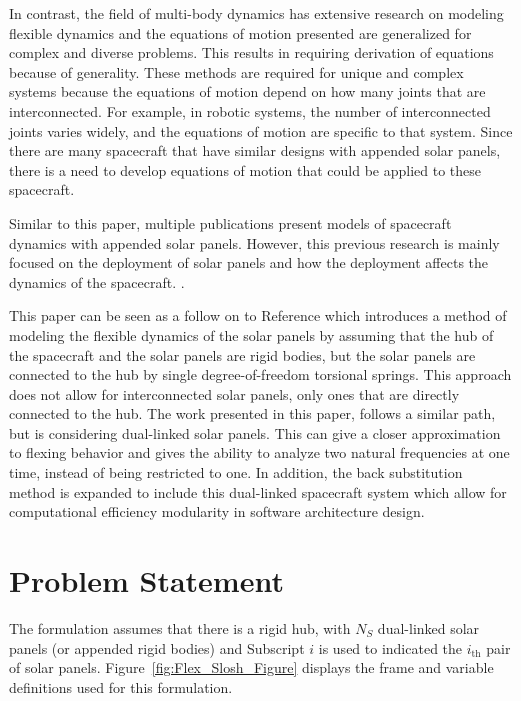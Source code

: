 \documentclass[paper]{aiaaNew}
\begin{document}
In contrast, the field of multi-body dynamics has extensive research on modeling flexible dynamics and the equations of motion presented are generalized for complex and diverse problems. This results in requiring derivation of equations because of generality. \cite{angeles2014kinematics, fleischer1974attitude,jerkovsky1978structure} These methods are required for unique and complex systems because the equations of motion depend on how many joints that are interconnected. For example, in robotic systems, the number of interconnected joints varies widely, and the equations of motion are specific to that system. \cite{zarafshan2010manipulation,moosavian2004explicit} Since there are many spacecraft that have similar designs with appended solar panels, there is a need to develop equations of motion that could be applied to these spacecraft. 

Similar to this paper, multiple publications present models of spacecraft dynamics with appended solar panels. \cite{kuang2004nonlinear,wallrapp2002simulation,wie1986modeling} However, this previous research is mainly focused on the deployment of solar panels and how the deployment affects the dynamics of the spacecraft. \cite{kuang2004nonlinear,wallrapp2002simulation,wie1986modeling}.

This paper can be seen as a follow on to Reference\cite{Allard2016rz} which introduces a method of modeling the flexible dynamics of the solar panels by assuming that the hub of the spacecraft and the solar panels are rigid bodies, but the solar panels are connected to the hub by single degree-of-freedom torsional springs. This approach does not allow for interconnected solar panels, only ones that are directly connected to the hub. The work presented in this paper, follows a similar path, but is considering dual-linked solar panels. This can give a closer approximation to flexing behavior and gives the ability to analyze two natural frequencies at one time, instead of being restricted to one. In addition, the back substitution method is expanded to include this dual-linked spacecraft system which allow for computational efficiency modularity in software architecture design.
		
	\section{Problem Statement}
	
	The formulation assumes that there is a rigid hub, with $N_S$ dual-linked solar panels (or appended rigid bodies) and Subscript $i$ is used to indicated the $i_\text{th}$ pair of solar panels. Figure~\ref{fig:Flex_Slosh_Figure} displays the frame and variable definitions used for this formulation.
\end{document}
